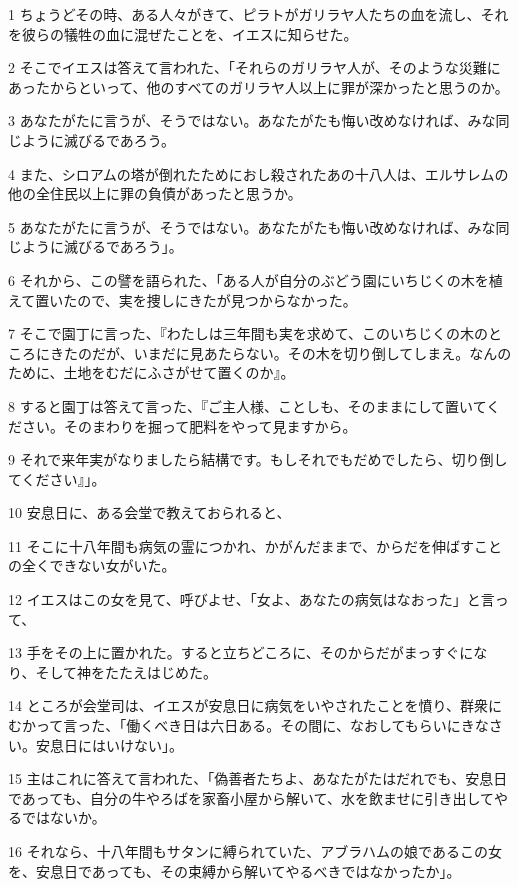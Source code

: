 \par 1 ちょうどその時、ある人々がきて、ピラトがガリラヤ人たちの血を流し、それを彼らの犠牲の血に混ぜたことを、イエスに知らせた。
\par 2 そこでイエスは答えて言われた、「それらのガリラヤ人が、そのような災難にあったからといって、他のすべてのガリラヤ人以上に罪が深かったと思うのか。
\par 3 あなたがたに言うが、そうではない。あなたがたも悔い改めなければ、みな同じように滅びるであろう。
\par 4 また、シロアムの塔が倒れたためにおし殺されたあの十八人は、エルサレムの他の全住民以上に罪の負債があったと思うか。
\par 5 あなたがたに言うが、そうではない。あなたがたも悔い改めなければ、みな同じように滅びるであろう」。
\par 6 それから、この譬を語られた、「ある人が自分のぶどう園にいちじくの木を植えて置いたので、実を捜しにきたが見つからなかった。
\par 7 そこで園丁に言った、『わたしは三年間も実を求めて、このいちじくの木のところにきたのだが、いまだに見あたらない。その木を切り倒してしまえ。なんのために、土地をむだにふさがせて置くのか』。
\par 8 すると園丁は答えて言った、『ご主人様、ことしも、そのままにして置いてください。そのまわりを掘って肥料をやって見ますから。
\par 9 それで来年実がなりましたら結構です。もしそれでもだめでしたら、切り倒してください』」。
\par 10 安息日に、ある会堂で教えておられると、
\par 11 そこに十八年間も病気の霊につかれ、かがんだままで、からだを伸ばすことの全くできない女がいた。
\par 12 イエスはこの女を見て、呼びよせ、「女よ、あなたの病気はなおった」と言って、
\par 13 手をその上に置かれた。すると立ちどころに、そのからだがまっすぐになり、そして神をたたえはじめた。
\par 14 ところが会堂司は、イエスが安息日に病気をいやされたことを憤り、群衆にむかって言った、「働くべき日は六日ある。その間に、なおしてもらいにきなさい。安息日にはいけない」。
\par 15 主はこれに答えて言われた、「偽善者たちよ、あなたがたはだれでも、安息日であっても、自分の牛やろばを家畜小屋から解いて、水を飲ませに引き出してやるではないか。
\par 16 それなら、十八年間もサタンに縛られていた、アブラハムの娘であるこの女を、安息日であっても、その束縛から解いてやるべきではなかったか」。
